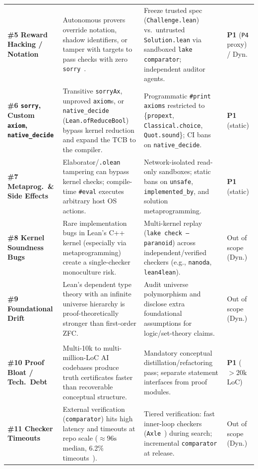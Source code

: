 \documentclass[11pt,letterpaper]{article}
\begin{document}
\begin{table}[!tbp]
\begin{tabularx}{\textwidth}{@{}>{\raggedright\arraybackslash}p{2.35cm}>{\raggedright\arraybackslash}X>{\raggedright\arraybackslash}X>{\raggedright\arraybackslash}p{1.25cm}@{}}
\textbf{\#5 Reward Hacking / Notation} & Autonomous provers override notation, shadow identifiers, or tamper with targets to pass checks with zero \texttt{sorry}~\cite{paglieri2026swarms}. & Freeze trusted spec (\texttt{Challenge.lean}) vs.\ untrusted \texttt{Solution.lean} via sandboxed \texttt{lake comparator}; independent auditor agents. & \textbf{P1} (\texttt{P4} proxy) / Dyn. \\
\textbf{\#6 \texttt{sorry}, Custom \texttt{axiom}, \texttt{native\_decide}} & Transitive \texttt{sorryAx}, unproved \texttt{axiom}s, or \texttt{native\_decide} (\texttt{Lean.ofReduceBool}) bypass kernel reduction and expand the TCB to the compiler. & Programmatic \texttt{\#print axioms} restricted to \{\texttt{propext}, \texttt{Classical.choice}, \texttt{Quot.sound}\}; CI bans on \texttt{native\_decide}. & \textbf{P1} (static) \\
\textbf{\#7 Metaprog.\ \& Side Effects} & Elaborator/\texttt{.olean} tampering can bypass kernel checks; compile-time \texttt{\#eval} executes arbitrary host OS actions. & Network-isolated read-only sandboxes; static bans on \texttt{unsafe}, \texttt{implemented\_by}, and solution metaprogramming. & \textbf{P1} (static) \\
\textbf{\#8 Kernel Soundness Bugs} & Rare implementation bugs in Lean's C++ kernel (especially via metaprogramming) create a single-checker monoculture risk. & Multi-kernel replay (\texttt{lake check --paranoid}) across independent/verified checkers (e.g., \texttt{nanoda}, \texttt{lean4lean}). & Out of scope (Dyn.) \\
\textbf{\#9 Foundational Drift} & Lean's dependent type theory with an infinite universe hierarchy is proof-theoretically stronger than first-order ZFC. & Audit universe polymorphism and disclose extra foundational assumptions for logic/set-theory claims. & Out of scope (Dyn.) \\
\midrule
\multicolumn{4}{@{}l}{\textit{\textbf{Layer C: Structural, Cognitive, and Operational Utility (``Is It Usable, Auditable Science?'')}}} \\
\textbf{\#10 Proof Bloat / Tech.\ Debt} & Multi-10k to multi-million-LoC AI codebases produce truth certificates faster than recoverable conceptual structure. & Mandatory conceptual distillation/refactoring pass; separate statement interfaces from proof modules. & \textbf{P1} ($>20\text{k}$ LoC) \\
\textbf{\#11 Checker Timeouts} & External verification (\texttt{comparator}) hits high latency and timeouts at repo scale ($\approx 96\text{s}$ median, 6.2\% timeouts~\cite{axle2026}). & Tiered verification: fast inner-loop checkers (\texttt{Axle}~\cite{axle2026}) during search; incremental \texttt{comparator} at release. & Out of scope (Dyn.) \\

\end{tabularx}
\end{table}
\end{document}
